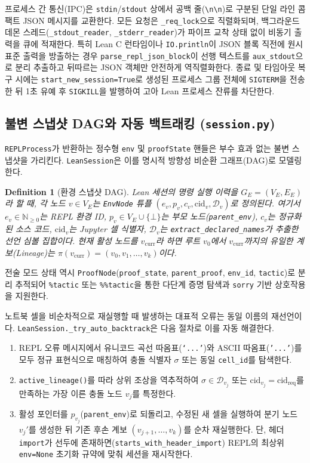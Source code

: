 \documentclass[journal]{IEEEtran}
\newcommand{\code}[1]{\texttt{#1}}
\newtheorem{definition}{Definition}
\begin{document}
프로세스 간 통신(IPC)은 \code{stdin}/\code{stdout} 상에서 공백 줄(\code{\textbackslash n\textbackslash n})로 구분된 단일 라인 콤팩트 JSON 메시지를 교환한다. 모든 요청은 \code{\_req\_lock}으로 직렬화되며, 백그라운드 데몬 스레드(\code{\_stdout\_reader}, \code{\_stderr\_reader})가 파이프 교착 상태 없이 비동기 출력을 큐에 적재한다. 특히 Lean C 런타임이나 \code{IO.println}이 JSON 블록 직전에 원시 표준 출력을 방출하는 경우 \code{parse\_repl\_json\_block}이 선행 텍스트를 \code{aux\_stdout}으로 분리 추출하고 뒤따르는 JSON 객체만 안전하게 역직렬화한다. 종료 및 타임아웃 복구 시에는 \code{start\_new\_session=True}로 생성된 프로세스 그룹 전체에 \code{SIGTERM}을 전송한 뒤 1초 유예 후 \code{SIGKILL}을 발행하여 고아 Lean 프로세스 잔류를 차단한다.

\subsection{불변 스냅샷 DAG와 자동 백트래킹 (\code{session.py})}
\code{REPLProcess}가 반환하는 정수형 \code{env} 및 \code{proofState} 핸들은 부수 효과 없는 불변 스냅샷을 가리킨다. \code{LeanSession}은 이를 명시적 방향성 비순환 그래프(DAG)로 모델링한다.

\begin{definition}[환경 스냅샷 DAG]
Lean 세션의 명령 실행 이력을 $G_E = (V_E, E_E)$라 할 때, 각 노드 $v \in V_E$는 \code{EnvNode} 튜플 $(e_v, p_v, c_v, \text{cid}_v, \mathcal{D}_v)$로 정의된다. 여기서 $e_v \in \mathbb{N}_{\ge 0}$는 REPL 환경 ID, $p_v \in V_E \cup \{\bot\}$는 부모 노드(\code{parent\_env}), $c_v$는 정규화된 소스 코드, $\text{cid}_v$는 Jupyter 셀 식별자, $\mathcal{D}_v$는 \code{extract\_declared\_names}가 추출한 선언 심볼 집합이다. 현재 활성 노드를 $v_{\text{curr}}$라 하면 루트 $v_0$에서 $v_{\text{curr}}$까지의 유일한 계보(Lineage)는 $\pi(v_{\text{curr}}) = (v_0, v_1, \dots, v_k)$이다.
\end{definition}

전술 모드 상태 역시 \code{ProofNode}(\code{proof\_state}, \code{parent\_proof}, \code{env\_id}, \code{tactic})로 분리 추적되어 \code{\%tactic} 또는 \code{\%\%tactic}을 통한 다단계 증명 탐색과 \code{sorry} 기반 상호작용을 지원한다.

노트북 셀을 비순차적으로 재실행할 때 발생하는 대표적 오류는 동일 이름의 재선언이다. \code{LeanSession.\_try\_auto\_backtrack}은 다음 절차로 이를 자동 해결한다.
\begin{enumerate}
  \item REPL 오류 메시지에서 유니코드 곡선 따옴표(\code{‘...’})와 ASCII 따옴표(\code{'...'})를 모두 정규 표현식으로 매칭하여 충돌 식별자 $\sigma$ 또는 동일 \code{cell\_id}를 탐색한다.
  \item \code{active\_lineage()}를 따라 상위 조상을 역추적하여 $\sigma \in \mathcal{D}_{v_j}$ 또는 $\text{cid}_{v_j} = \text{cid}_{\text{req}}$를 만족하는 가장 이른 충돌 노드 $v_j$를 특정한다.
  \item 활성 포인터를 $p_{v_j}$(\code{parent\_env})로 되돌리고, 수정된 새 셀을 실행하여 분기 노드 $v_j'$를 생성한 뒤 기존 후손 계보 $(v_{j+1}, \dots, v_k)$를 순차 재실행한다. 단, 헤더 \code{import}가 선두에 존재하면(\code{starts\_with\_header\_import}) REPL의 최상위 \code{env=None} 초기화 규약에 맞춰 세션을 재시작한다.
\end{enumerate}
\end{document}
